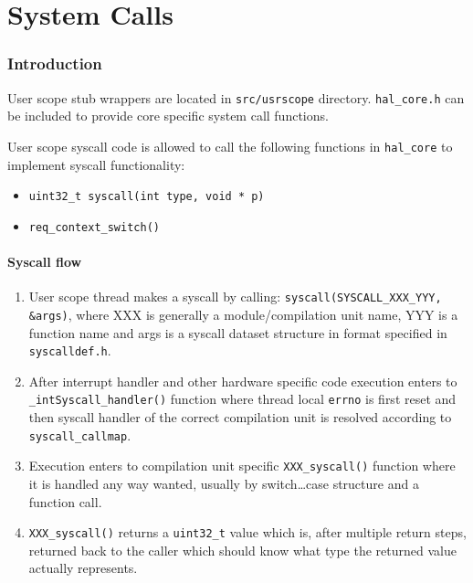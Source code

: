 \part{System Calls}

\section{Introduction}
User scope stub wrappers are located in \verb+src/usrscope+ directory.
\verb+hal_core.h+ can be included to provide core specific system call
functions.

User scope syscall code is allowed to call the following functions in
\verb+hal_core+ to implement syscall functionality:

\begin{itemize}
  \item \verb+uint32_t syscall(int type, void * p)+
  \item \verb+req_context_switch()+
\end{itemize}

\subsection{Syscall flow}

\begin{enumerate}
\item User scope thread makes a syscall by calling:
      \verb+syscall(SYSCALL_XXX_YYY, &args)+, where XXX is generally a
      module/compilation unit name, YYY is a function name and args is a
      syscall dataset structure in format specified in \verb+syscalldef.h+.

\item After interrupt handler and other hardware specific code execution enters
      to \verb+_intSyscall_handler()+ function where thread local \verb+errno+
      is first reset and then syscall handler of the correct compilation unit is
      resolved according to \verb+syscall_callmap+.

\item Execution enters to compilation unit specific \verb+XXX_syscall()+
      function where it is handled any way wanted, usually by switch\ldots case
      structure and a function call.

\item \verb+XXX_syscall()+ returns a \verb+uint32_t+ value which is, after
      multiple return steps, returned back to the caller which should know
      what type the returned value actually represents.
\end{enumerate}


